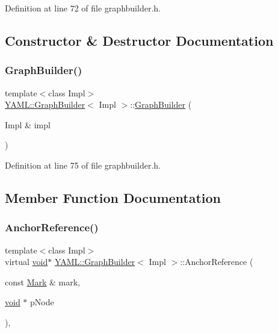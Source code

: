 Definition at line 72 of file graphbuilder.\+h.



\subsection{Constructor \& Destructor Documentation}
\mbox{\label{class_y_a_m_l_1_1_graph_builder_ae7f73588ad09321c10c09dff742bcc62}} 
\subsubsection{\texorpdfstring{GraphBuilder()}{GraphBuilder()}}
{\footnotesize\ttfamily template$<$class Impl$>$ \\
\mbox{\hyperlink{class_y_a_m_l_1_1_graph_builder}{Y\+A\+M\+L\+::\+Graph\+Builder}}$<$ Impl $>$\+::\mbox{\hyperlink{class_y_a_m_l_1_1_graph_builder}{Graph\+Builder}} (\begin{DoxyParamCaption}\item[{Impl \&}]{impl }\end{DoxyParamCaption})\hspace{0.3cm}{\ttfamily [inline]}}



Definition at line 75 of file graphbuilder.\+h.



\subsection{Member Function Documentation}
\mbox{\label{class_y_a_m_l_1_1_graph_builder_a64e7ef2c78f86a1eb93d5d6fd5e560ea}} 
\subsubsection{\texorpdfstring{AnchorReference()}{AnchorReference()}}
{\footnotesize\ttfamily template$<$class Impl$>$ \\
virtual \mbox{\hyperlink{glad_8h_a950fc91edb4504f62f1c577bf4727c29}{void}}$\ast$ \mbox{\hyperlink{class_y_a_m_l_1_1_graph_builder}{Y\+A\+M\+L\+::\+Graph\+Builder}}$<$ Impl $>$\+::Anchor\+Reference (\begin{DoxyParamCaption}\item[{const \mbox{\hyperlink{struct_y_a_m_l_1_1_mark}{Mark}} \&}]{mark,  }\item[{\mbox{\hyperlink{glad_8h_a950fc91edb4504f62f1c577bf4727c29}{void}} $\ast$}]{p\+Node }\end{DoxyParamCaption})\hspace{0.3cm}{\ttfamily [inline]}, {\ttfamily [virtual]}}



